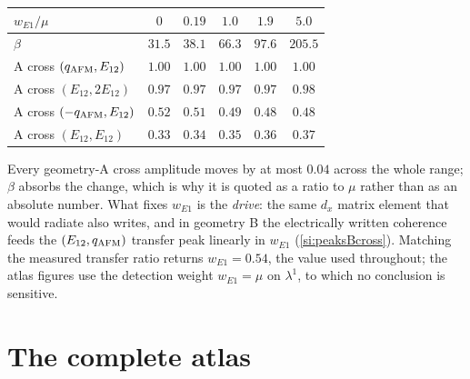 \documentclass[11pt]{article}
\newcommand{\qafm}{q_{\rm AFM}}
\begin{document}
\begin{center}\small
\renewcommand{\arraystretch}{1.25}
\begin{tabular}{lccccc}
\toprule
$w_{E1}/\mu$ & $0$ & $0.19$ & $1.0$ & $1.9$ & $5.0$\\
\midrule
$\beta$ & $31.5$ & $38.1$ & $66.3$ & $97.6$ & $205.5$\\
\midrule
A cross $(\qafm,E_{12})$ & $1.00$ & $1.00$ & $1.00$ & $1.00$ & $1.00$\\
A cross $(E_{12},2E_{12})$ & $0.97$ & $0.97$ & $0.97$ & $0.97$ & $0.98$\\
A cross $(-\qafm,E_{12})$ & $0.52$ & $0.51$ & $0.49$ & $0.48$ & $0.48$\\
A cross $(E_{12},E_{12})$ & $0.33$ & $0.34$ & $0.35$ & $0.36$ & $0.37$\\
\bottomrule
\end{tabular}
\end{center}
Every geometry-A cross amplitude moves by at most $0.04$ across the
whole range; $\beta$ absorbs the change, which is why it is quoted as a
ratio to $\mu$ rather than as an absolute number.  What fixes $w_{E1}$
is the \emph{drive}: the same $d_x$ matrix element that would radiate
also writes, and in geometry B the electrically written coherence feeds
the $(E_{12},\qafm)$ transfer peak linearly in $w_{E1}$
(\cref{si:peaksBcross}).  Matching the measured transfer ratio returns
$w_{E1}=0.54$, the value used throughout; the atlas figures use the
detection weight $w_{E1}=\mu$ on $\lambda^1$, to which no conclusion is
sensitive.

\section{The complete atlas}
\label{si:atlas}
\end{document}
